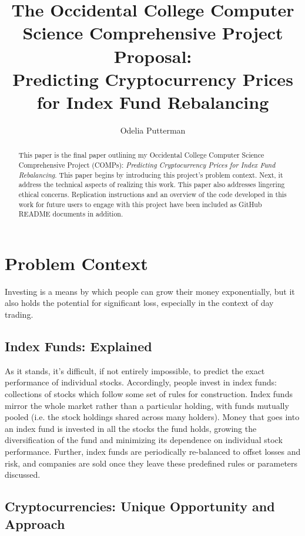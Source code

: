 \documentclass[10pt,twocolumn]{article}
\title{The Occidental College Computer Science Comprehensive Project Proposal: \\ Predicting Cryptocurrency Prices for Index Fund Rebalancing}
\author{Odelia Putterman}
\affiliation{Occidental College}
\begin{document}
\maketitle

\begin{abstract}
This paper is the final paper outlining my Occidental College Computer Science Comprehensive Project (COMPs): \textit{Predicting Cryptocurrency Prices for Index Fund Rebalancing}. This paper begins by introducing this project's problem context. Next, it address the technical aspects of realizing this work. This paper also addresses lingering ethical concerns. Replication instructions and an overview of the code developed in this work for future users to engage with this project have been included as GitHub README documents in addition.
\end{abstract}

\section{Problem Context} \label{problemcontext}

Investing is a means by which people can grow their money exponentially, but it also holds the potential for significant loss, especially in the context of day trading.

\subsection{Index Funds: Explained}

As it stands, it's difficult, if not entirely impossible, to predict the exact performance of individual stocks. Accordingly, people invest in index funds: collections of stocks which follow some set of rules for construction. Index funds mirror the whole market rather than a particular holding, with funds mutually pooled (i.e. the stock holdings shared across many holders). Money that goes into an index fund is invested in all the stocks the fund holds, growing the diversification of the fund and minimizing its dependence on individual stock performance. Further, index funds are periodically re-balanced to offset losses and risk, and companies are sold once they leave these predefined rules or parameters discussed.

\subsection{Cryptocurrencies: Unique Opportunity and Approach}
\end{document}
